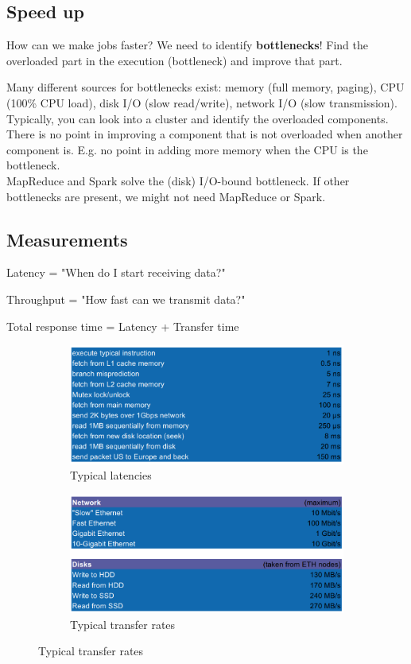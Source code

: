 \documentclass[11pt,oneside,a4paper]{article}
\begin{document}
{\subsection{Speed up}

How can we make jobs faster? We need to identify \textbf{bottlenecks}! Find the overloaded part in the execution (bottleneck) and improve that part.

Many different sources for bottlenecks exist: memory (full memory, paging), CPU (100\% CPU load), disk I/O (slow read/write), network I/O (slow transmission). Typically, you can look into a cluster and identify the overloaded components. There is no point in improving a component that is not overloaded when another component is. E.g. no point in adding more memory when the CPU is the bottleneck.\\

MapReduce and Spark solve the (disk) I/O-bound bottleneck. If other bottlenecks are present, we might not need MapReduce or Spark.


\subsection{Measurements}

Latency = "When do I start receiving data?"

Throughput = "How fast can we transmit data?"

Total response time = Latency + Transfer time

\begin{figure}[hb!]
	\centering
	\begin{subfigure}[t]{.5\textwidth}
		\centering
		\includegraphics[width=1\linewidth]{figures/performance_latencies}
		\caption{Typical latencies}
	\end{subfigure}%
	\begin{subfigure}[t]{.5\textwidth}
		\centering
		\includegraphics[width=1\linewidth]{figures/performance_throughput}
		\caption{Typical transfer rates}
	\end{subfigure}
\end{figure}

}
\end{document}
